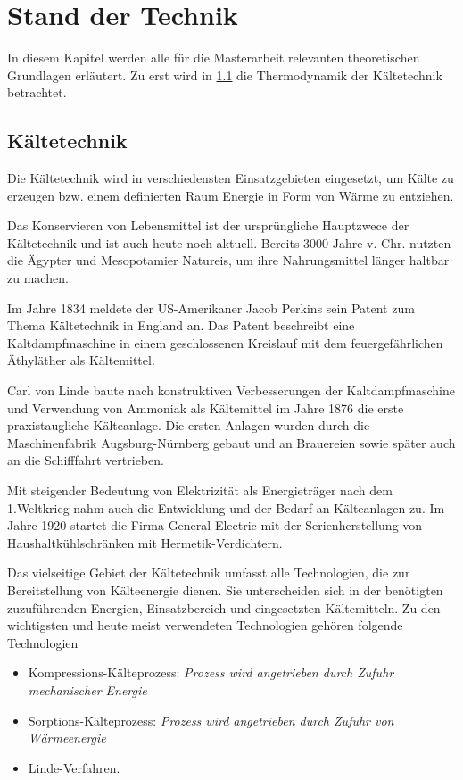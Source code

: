 \chapter{Stand der Technik}
\label{cha:Stand der Technik}

In diesem Kapitel werden alle für die Masterarbeit relevanten theoretischen Grundlagen erläutert. 
Zu erst wird in \ref{sec:Kaeltetechnik} die Thermodynamik der Kältetechnik betrachtet. 

\section{Kältetechnik}
\label{sec:Kaeltetechnik}

Die Kältetechnik wird in verschiedensten Einsatzgebieten eingesetzt, um Kälte zu erzeugen bzw. einem definierten Raum Energie in Form von Wärme zu entziehen. 

Das Konservieren von Lebensmittel ist  der ursprüngliche Hauptzwece der Kältetechnik und ist auch heute noch aktuell. Bereits 3000 Jahre v. Chr. nutzten die Ägypter und Mesopotamier Natureis, um ihre Nahrungsmittel länger haltbar zu machen.\citep{Danfoss2006}

Im Jahre 1834 meldete der US-Amerikaner Jacob Perkins sein Patent zum Thema Kältetechnik in England an. Das Patent beschreibt eine Kaltdampfmaschine in einem geschlossenen Kreislauf mit dem feuergefährlichen Äthyläther als Kältemittel.\citep{Siemens2007}

Carl von Linde baute nach konstruktiven Verbesserungen der Kaltdampfmaschine und Verwendung von Ammoniak als Kältemittel im Jahre 1876 die erste praxistaugliche Kälteanlage. Die ersten Anlagen wurden durch die Maschinenfabrik Augsburg-Nürnberg gebaut und an Brauereien sowie später auch an die Schifffahrt vertrieben.

Mit steigender Bedeutung von Elektrizität als Energieträger nach dem 1.Weltkrieg nahm auch die Entwicklung und der Bedarf an Kälteanlagen zu. Im Jahre 1920 startet die Firma General Electric mit der Serienherstellung von Haushaltkühlschränken mit Hermetik-Verdichtern.

Das vielseitige Gebiet der Kältetechnik umfasst alle Technologien, die zur Bereitstellung von Kälteenergie dienen. Sie unterscheiden sich in der benötigten zuzuführenden Energien, Einsatzbereich und eingesetzten Kältemitteln.  Zu den wichtigsten und heute meist verwendeten Technologien gehören folgende Technologien

\begin{itemize}

\item Kompressions-Kälteprozess: \textit{Prozess wird angetrieben durch Zufuhr mechanischer Energie}
\item Sorptions-Kälteprozess: \textit{Prozess wird angetrieben durch Zufuhr von Wärmeenergie}
\item Linde-Verfahren.

\end{itemize}

